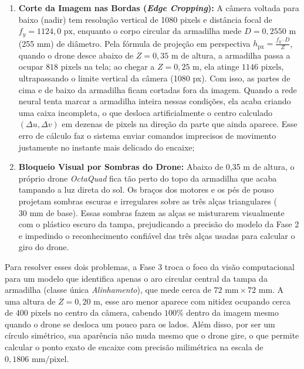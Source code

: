 \begin{enumerate}
	\item \textbf{Corte da Imagem nas Bordas (\textit{Edge Cropping}):} A câmera voltada para baixo (nadir) tem resolução vertical de 1080 pixels e distância focal de $f_y = 1124{,}0\text{ px}$, enquanto o corpo circular da armadilha mede $D = 0{,}2550\text{ m}$ (255 mm) de diâmetro. Pela fórmula de projeção em perspectiva $h_{\text{px}} = \frac{f_y \cdot D}{Z}$, quando o drone desce abaixo de $Z = 0{,}35\text{ m}$ de altura, a armadilha passa a ocupar $818\text{ pixels}$ na tela; ao chegar a $Z = 0{,}25\text{ m}$, ela atinge $1146\text{ pixels}$, ultrapassando o limite vertical da câmera (1080 px). Com isso, as partes de cima e de baixo da armadilha ficam cortadas fora da imagem. Quando a rede neural tenta marcar a armadilha inteira nessas condições, ela acaba criando uma caixa incompleta, o que desloca artificialmente o centro calculado $(\Delta u, \Delta v)$ em dezenas de pixels na direção da parte que ainda aparece. Esse erro de cálculo faz o sistema enviar comandos imprecisos de movimento justamente no instante mais delicado do encaixe;
	
	\item \textbf{Bloqueio Visual por Sombras do Drone:} Abaixo de 0,35 m de altura, o próprio drone \textit{OctaQuad} fica tão perto do topo da armadilha que acaba tampando a luz direta do sol. Os braços dos motores e os pés de pouso projetam sombras escuras e irregulares sobre as três alças triangulares ($30\text{ mm}$ de base). Essas sombras fazem as alças se misturarem visualmente com o plástico escuro da tampa, prejudicando a precisão do modelo da Fase 2 e impedindo o reconhecimento confiável das três alças usadas para calcular o giro do drone.
\end{enumerate}

Para resolver esses dois problemas, a Fase 3 troca o foco da visão computacional para um modelo que identifica apenas o aro circular central da tampa da armadilha (classe única \textit{Alinhamento}), que mede cerca de $72\text{ mm} \times 72\text{ mm}$. A uma altura de $Z = 0{,}20\text{ m}$, esse aro menor aparece com nitidez ocupando cerca de $400\text{ pixels}$ no centro da câmera, cabendo $100\%$ dentro da imagem mesmo quando o drone se desloca um pouco para os lados. Além disso, por ser um círculo simétrico, sua aparência não muda mesmo que o drone gire, o que permite calcular o ponto exato de encaixe com precisão milimétrica na escala de $0{,}1806\text{ mm/pixel}$.

